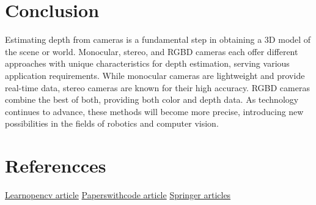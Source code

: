 \documentclass{article}
\begin{document}
\section{Conclusion}
Estimating depth from cameras is a fundamental step in obtaining a 3D model of the scene or world. Monocular, stereo, and RGBD cameras each offer different approaches with unique characteristics for depth estimation, serving various application requirements. While monocular cameras are lightweight and provide real-time data, stereo cameras are known for their high accuracy. RGBD cameras combine the best of both, providing both color and depth data. As technology continues to advance, these methods will become more precise, introducing new possibilities in the fields of robotics and computer vision.

\section{Referencces}
\href{https://learnopencv.com/depth-perception-using-stereo-camera-python-c/}{Learnopencv article}
\newline
\href{https://paperswithcode.com/task/monocular-depth-estimation}{Paperswithcode article}
\newline
\href{https://link.springer.com/referenceworkentry/10.1007/978-3-030-63416-2_125}{Springer articles}
\end{document}
